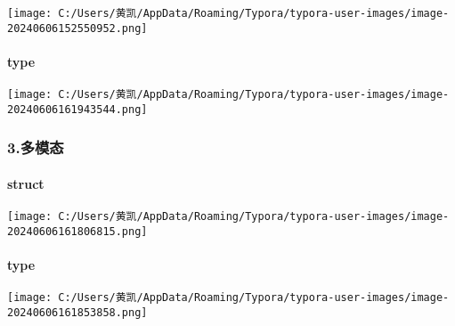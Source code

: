 \documentclass[
]{article}
\begin{document}
\texttt{[image: C:/Users/黄凯/AppData/Roaming/Typora/typora-user-images/image-20240606152550952.png]}

\paragraph{type}\label{type-2}

\texttt{[image: C:/Users/黄凯/AppData/Roaming/Typora/typora-user-images/image-20240606161943544.png]}

\subsubsection{3.多模态}\label{3ux591aux6a21ux6001}

\paragraph{struct}\label{struct-3}

\texttt{[image: C:/Users/黄凯/AppData/Roaming/Typora/typora-user-images/image-20240606161806815.png]}

\paragraph{type}\label{type-3}

\texttt{[image: C:/Users/黄凯/AppData/Roaming/Typora/typora-user-images/image-20240606161853858.png]}
\end{document}
